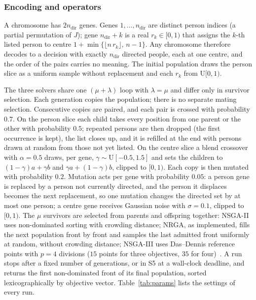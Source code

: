 \documentclass[systems,article,submit,moreauthors,pdftex]{Definitions/mdpi}
\begin{document}
\subsubsection{Encoding and operators}
A chromosome has $2n_{\mathrm{dir}}$ genes. Genes $1,\dots,n_{\mathrm{dir}}$ are distinct
person indices (a partial permutation of $J$); gene $n_{\mathrm{dir}}+k$ is a real
$r_k\in[0,1)$ that assigns the $k$-th listed person to centre
$1+\min\{\lfloor n\,r_k\rfloor,\,n-1\}$. Any chromosome therefore decodes to a decision with
exactly $n_{\mathrm{dir}}$ directed people, each at one centre, and the order of the pairs
carries no meaning. The initial population draws the person slice as a uniform sample
without replacement and each $r_k$ from $\mathrm{U}[0,1)$.

The three solvers share one $(\mu+\lambda)$ loop with $\lambda=\mu$ and differ only in
survivor selection. Each generation copies the population; there is no separate mating
selection. Consecutive copies are paired, and each pair is crossed with probability $0.7$.
On the person slice each child takes every position from one parent or the other with
probability $0.5$; repeated persons are then dropped (the first occurrence is kept), the list
closes up, and it is refilled at the end with persons drawn at random from those not yet
listed. On the centre slice a blend crossover with $\alpha=0.5$ draws, per gene,
$\gamma\sim\mathrm{U}[-0.5,1.5]$ and sets the children to $(1-\gamma)a+\gamma b$ and
$\gamma a+(1-\gamma)b$, clipped to $[0,1)$. Each copy is then mutated with probability $0.2$.
Mutation acts per gene with probability $0.05$: a person gene is replaced by a person not
currently directed, and the person it displaces becomes the next replacement, so one
mutation changes the directed set by at most one person; a centre gene receives Gaussian
noise with $\sigma=0.1$, clipped to $[0,1)$. The $\mu$ survivors are selected from parents
and offspring together: NSGA-II uses non-dominated sorting with crowding distance; NRGA, as implemented,
fills the next population front by front and samples the last admitted front uniformly at
random, without crowding distance; NSGA-III uses Das--Dennis reference points with $p=4$
divisions ($15$ points for three objectives, $35$ for four)~\cite{deb2014nsga3}. A run stops
after a fixed number of generations, or in S5 at a wall-clock deadline, and returns the first non-dominated front of its final population, sorted
lexicographically by objective vector. Table~\ref{tab:params} lists the settings of every run.
\end{document}
